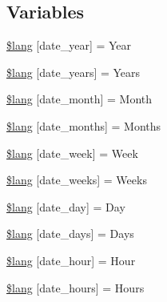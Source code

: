 \subsection*{Variables}
\begin{DoxyCompactItemize}
\item 
\hyperlink{system_2language_2english_2date__lang_8php_ad344b819f5b881c0e2d75c994b8781b7}{\$lang} \mbox{[}\textquotesingle{}date\+\_\+year\textquotesingle{}\mbox{]} = \textquotesingle{}Year\textquotesingle{}
\item 
\hyperlink{system_2language_2english_2date__lang_8php_ad553cabe66c6e6feff320f69fadfc561}{\$lang} \mbox{[}\textquotesingle{}date\+\_\+years\textquotesingle{}\mbox{]} = \textquotesingle{}Years\textquotesingle{}
\item 
\hyperlink{system_2language_2english_2date__lang_8php_a27b6a453e0ff873f09050b0882b86b43}{\$lang} \mbox{[}\textquotesingle{}date\+\_\+month\textquotesingle{}\mbox{]} = \textquotesingle{}Month\textquotesingle{}
\item 
\hyperlink{system_2language_2english_2date__lang_8php_af22d57f979004523c31e7252891b8ce1}{\$lang} \mbox{[}\textquotesingle{}date\+\_\+months\textquotesingle{}\mbox{]} = \textquotesingle{}Months\textquotesingle{}
\item 
\hyperlink{system_2language_2english_2date__lang_8php_a027a67b9a8e626d4a9b4080f8100ca53}{\$lang} \mbox{[}\textquotesingle{}date\+\_\+week\textquotesingle{}\mbox{]} = \textquotesingle{}Week\textquotesingle{}
\item 
\hyperlink{system_2language_2english_2date__lang_8php_af09796515b005d759204f911305a8459}{\$lang} \mbox{[}\textquotesingle{}date\+\_\+weeks\textquotesingle{}\mbox{]} = \textquotesingle{}Weeks\textquotesingle{}
\item 
\hyperlink{system_2language_2english_2date__lang_8php_ab414526293ffead872f9b90ed4fdd552}{\$lang} \mbox{[}\textquotesingle{}date\+\_\+day\textquotesingle{}\mbox{]} = \textquotesingle{}Day\textquotesingle{}
\item 
\hyperlink{system_2language_2english_2date__lang_8php_abb37886fce0ac3f342d17f4132740870}{\$lang} \mbox{[}\textquotesingle{}date\+\_\+days\textquotesingle{}\mbox{]} = \textquotesingle{}Days\textquotesingle{}
\item 
\hyperlink{system_2language_2english_2date__lang_8php_a7a4e78ef1f19291c5a7818cf08bfa3ca}{\$lang} \mbox{[}\textquotesingle{}date\+\_\+hour\textquotesingle{}\mbox{]} = \textquotesingle{}Hour\textquotesingle{}
\item 
\hyperlink{system_2language_2english_2date__lang_8php_ad1fe07226d651882b9ecce9cb2011db2}{\$lang} \mbox{[}\textquotesingle{}date\+\_\+hours\textquotesingle{}\mbox{]} = \textquotesingle{}Hours\textquotesingle{}

\end{DoxyCompactItemize}
